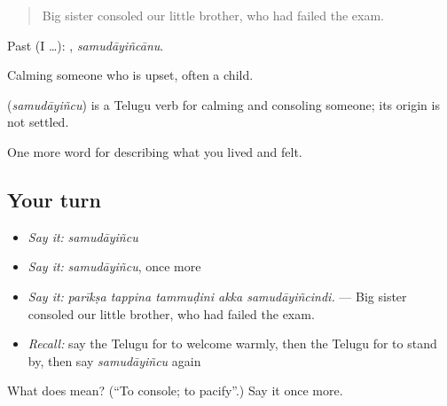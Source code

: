 \begin{quote}
Big sister consoled our little brother, who had failed the exam.
\end{quote}

Past (I …): , \emph{samudāyiñcānu}.

Calming someone who is upset, often a child.

\begin{cousinweb}
\textbf{} (\emph{samudāyiñcu}) is a Telugu verb for calming and consoling someone; its origin is not settled.
\end{cousinweb}

\begin{grammarlens}[title={What you've built}]
One more word for describing what you lived and felt.
\end{grammarlens}

\subsection*{Your turn}
\begin{itemize}
\raggedright
  \item \emph{Say it:} \emph{samudāyiñcu}
  \item \emph{Say it:} \emph{samudāyiñcu}, once more
  \item \emph{Say it:} \emph{parīkṣa tappina tammuḍini akka samudāyiñcindi.} — Big sister consoled our little brother, who had failed the exam.
  \item \emph{Recall:} say the Telugu for to welcome warmly, then the Telugu for to stand by, then say \emph{samudāyiñcu} again
\end{itemize}

\begin{tcolorbox}[breakable,colback=teal!4,colframe=teal!35!black,title={Before you move on}]
What does  mean? (\textquotedblleft{}To console; to pacify\textquotedblright{}.) Say it once more.
\end{tcolorbox}
